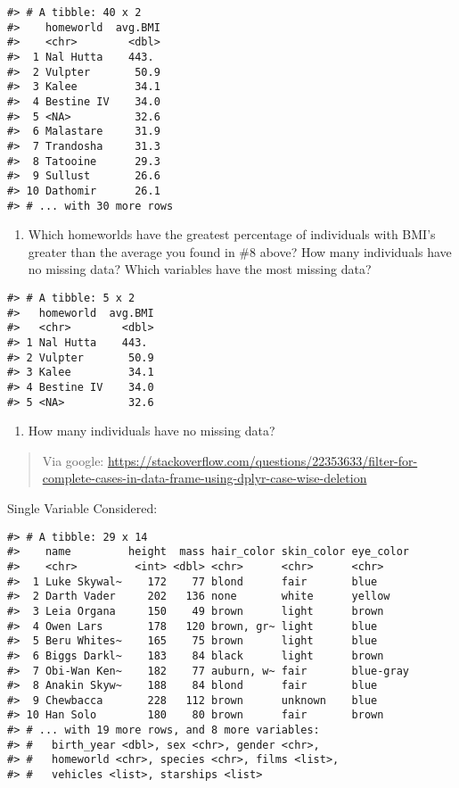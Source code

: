 \documentclass[
]{book}
\providecommand{\tightlist}{%
  \setlength{\itemsep}{0pt}\setlength{\parskip}{0pt}}
\begin{document}
\begin{verbatim}
#> # A tibble: 40 x 2
#>    homeworld  avg.BMI
#>    <chr>        <dbl>
#>  1 Nal Hutta    443. 
#>  2 Vulpter       50.9
#>  3 Kalee         34.1
#>  4 Bestine IV    34.0
#>  5 <NA>          32.6
#>  6 Malastare     31.9
#>  7 Trandosha     31.3
#>  8 Tatooine      29.3
#>  9 Sullust       26.6
#> 10 Dathomir      26.1
#> # ... with 30 more rows
\end{verbatim}

\begin{enumerate}
\def\labelenumi{\arabic{enumi}.}
\setcounter{enumi}{8}
\tightlist
\item
  Which homeworlds have the greatest percentage of individuals with BMI's greater than the average you found in \#8 above?
  How many individuals have no missing data? Which variables have the most missing data?
\end{enumerate}

\begin{verbatim}
#> # A tibble: 5 x 2
#>   homeworld  avg.BMI
#>   <chr>        <dbl>
#> 1 Nal Hutta    443. 
#> 2 Vulpter       50.9
#> 3 Kalee         34.1
#> 4 Bestine IV    34.0
#> 5 <NA>          32.6
\end{verbatim}

\begin{enumerate}
\def\labelenumi{\arabic{enumi}.}
\setcounter{enumi}{9}
\tightlist
\item
  How many individuals have no missing data?
\end{enumerate}

\begin{quote}
Via google: \url{https://stackoverflow.com/questions/22353633/filter-for-complete-cases-in-data-frame-using-dplyr-case-wise-deletion}
\end{quote}

Single Variable Considered:

\begin{verbatim}
#> # A tibble: 29 x 14
#>    name         height  mass hair_color skin_color eye_color
#>    <chr>         <int> <dbl> <chr>      <chr>      <chr>    
#>  1 Luke Skywal~    172    77 blond      fair       blue     
#>  2 Darth Vader     202   136 none       white      yellow   
#>  3 Leia Organa     150    49 brown      light      brown    
#>  4 Owen Lars       178   120 brown, gr~ light      blue     
#>  5 Beru Whites~    165    75 brown      light      blue     
#>  6 Biggs Darkl~    183    84 black      light      brown    
#>  7 Obi-Wan Ken~    182    77 auburn, w~ fair       blue-gray
#>  8 Anakin Skyw~    188    84 blond      fair       blue     
#>  9 Chewbacca       228   112 brown      unknown    blue     
#> 10 Han Solo        180    80 brown      fair       brown    
#> # ... with 19 more rows, and 8 more variables:
#> #   birth_year <dbl>, sex <chr>, gender <chr>,
#> #   homeworld <chr>, species <chr>, films <list>,
#> #   vehicles <list>, starships <list>
\end{verbatim}
\end{document}
